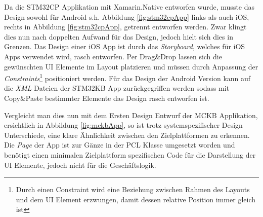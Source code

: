 	Da die STM32CP Applikation mit Xamarin.Native entworfen wurde, musste das Design sowohl für Android s.h. Abbildung \ref{fig:stm32cpApp} links als auch iOS, rechts in Abbildung \ref{fig:stm32cpApp}, getrennt entworfen werden. Zwar klingt dies nun nach doppelten Aufwand für das Design, jedoch hielt sich dies in Grenzen. Das Design einer iOS App ist durch das \textit{Storyboard}, welches für iOS Apps verwendet wird, rasch entworfen. Per Drag\&Drop lassen sich die gewünschten UI Elemente im Layout platzieren und müssen durch Anpassung der \textit{Constraints}\footnote{Durch einen Constraint wird eine Beziehung zwischen Rahmen des Layouts und dem UI Element erzwungen, damit dessen relative Position immer gleich ist} positioniert werden. Für das Design der Android Version kann auf die \textit{XML} Dateien der STM32KB App zurückgegriffen werden sodass mit Copy\&Paste bestimmter Elemente das Design rasch entworfen ist.

	\newpage
	Vergleicht man dies nun mit dem Ersten Design Entwurf der MCKB Applikation, ersichtlich in Abbildung \ref{fig:mckbApp}, so ist trotz systemspezifischer Design Unterschiede, eine klare Ähnlichkeit zwischen den Zielplattformen zu erkennen. Die \textit{Page} der App ist zur Gänze in der PCL Klasse umgesetzt worden und benötigt einen minimalen Zielplattform spezifischen Code für die Darstellung der UI Elemente, jedoch nicht für die Geschäftslogik. 

